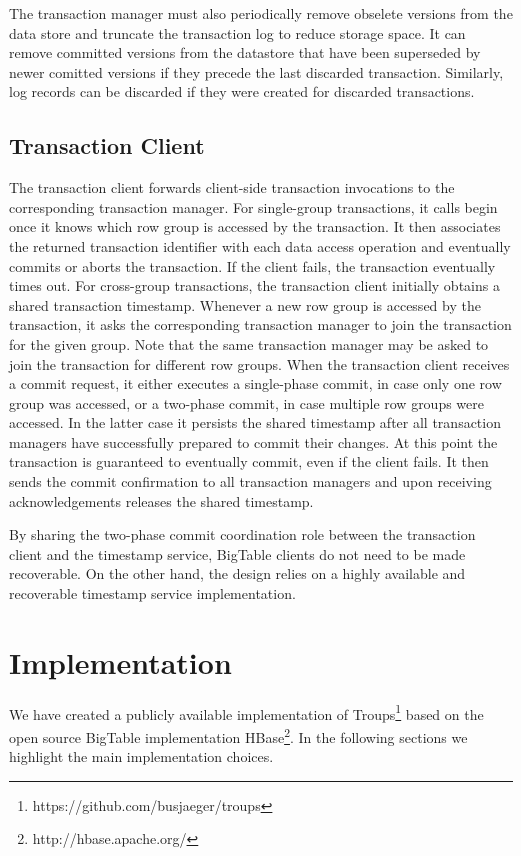\documentclass[10pt,final,journal]{IEEEtran}
\begin{document}
The transaction manager must also periodically remove obselete versions from the data store and truncate the transaction log to reduce storage space. It can remove committed versions from the datastore that have been superseded by newer comitted versions if they precede the last discarded transaction. Similarly, log records can be discarded if they were created for discarded transactions.

\subsection{Transaction Client}
The transaction client forwards client-side transaction invocations to the corresponding transaction manager. For single-group transactions, it calls begin once it knows which row group is accessed by the transaction. It then associates the returned transaction identifier with each data access operation and eventually commits or aborts the transaction. If the client fails, the transaction eventually times out. For cross-group transactions, the transaction client initially obtains a shared transaction timestamp. Whenever a new row group is accessed by the transaction, it asks the corresponding transaction manager to join the transaction for the given group. Note that the same transaction manager may be asked to join the transaction for different row groups. When the transaction client receives a commit request, it either executes a single-phase commit, in case only one row group was accessed, or a two-phase commit, in case multiple row groups were accessed. In the latter case it persists the shared timestamp after all transaction managers have successfully prepared to commit their changes. At this point the transaction is guaranteed to eventually commit, even if the client fails. It then sends the commit confirmation to all transaction managers and upon receiving acknowledgements releases the shared timestamp.

By sharing the two-phase commit coordination role between the transaction client and the timestamp service, BigTable clients do not need to be made recoverable. On the other hand, the design relies on a highly available and recoverable timestamp service implementation.

\section{Implementation}
We have created a publicly available implementation of Troups\footnote{https://github.com/busjaeger/troups} based on the open source BigTable implementation HBase\footnote{http://hbase.apache.org/}. In the following sections we highlight the main implementation choices.
\end{document}
